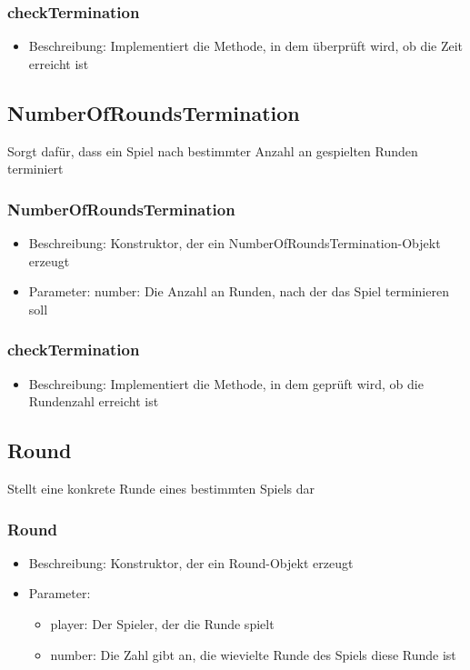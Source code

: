 \documentclass[a4paper]{scrreprt}
\begin{document}
	\subsubsection{checkTermination}
	\begin{itemize}
		\item Beschreibung: Implementiert die Methode, in dem überprüft wird, ob die Zeit erreicht ist
	\end{itemize}
	
	\subsection{NumberOfRoundsTermination}
	Sorgt dafür, dass ein Spiel nach bestimmter Anzahl an gespielten Runden terminiert
	\subsubsection{NumberOfRoundsTermination}
		\begin{itemize}
		\item Beschreibung: Konstruktor, der ein NumberOfRoundsTermination-Objekt erzeugt
		\item Parameter: number: Die Anzahl an Runden, nach der das Spiel terminieren soll	
		\end{itemize}
	\subsubsection{checkTermination}
	\begin{itemize}
		\item Beschreibung: Implementiert die Methode, in dem geprüft wird, ob die Rundenzahl erreicht ist
	\end{itemize}
	
	\subsection{Round}
	Stellt eine konkrete Runde eines bestimmten Spiels dar
	\subsubsection{Round}
		\begin{itemize}
		\item Beschreibung: Konstruktor, der ein Round-Objekt erzeugt
		\item Parameter: 
		\begin{itemize}
		\item player: Der Spieler, der die Runde spielt
		\item number: Die Zahl gibt an, die wievielte Runde des Spiels diese Runde ist
		\end{itemize}
		\end{itemize}
\end{document}
